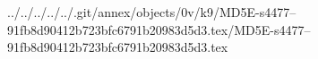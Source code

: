 ../../../../../.git/annex/objects/0v/k9/MD5E-s4477--91fb8d90412b723bfc6791b20983d5d3.tex/MD5E-s4477--91fb8d90412b723bfc6791b20983d5d3.tex